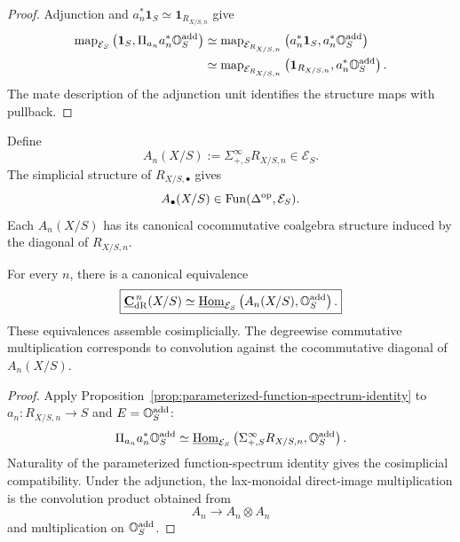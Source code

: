 \begin{proof}
Adjunction and \(a_n^*\mathbf 1_S\simeq\mathbf 1_{R_{X/S,n}}\) give
\[
\begin{aligned}
    \operatorname{map}_{\mathcal E_S}
    \left(
        \mathbf 1_S,\Pi_{a_n}a_n^*\mathbb O_S^{\mathrm{add}}
    \right)
    &\simeq
    \operatorname{map}_{\mathcal E_{R_{X/S,n}}}
    \left(
        a_n^*\mathbf 1_S,a_n^*\mathbb O_S^{\mathrm{add}}
    \right)
    \\
    &\simeq
    \operatorname{map}_{\mathcal E_{R_{X/S,n}}}
    \left(
        \mathbf 1_{R_{X/S,n}},a_n^*\mathbb O_S^{\mathrm{add}}
    \right).
\end{aligned}
\]
The mate description of the adjunction unit identifies the structure maps with pullback.
\end{proof}

\begin{construction}
\label{constr:suspension-modal-nerve}
Define
\[
\boxed{
    A_n(X/S)
    :=
    \Sigma^\infty_{+,S}R_{X/S,n}
    \in\mathcal E_S.
}
\]
The simplicial structure of \(R_{X/S,\bullet}\) gives
\[
    A_\bullet(X/S)\in\operatorname{Fun}(\Delta^{\mathrm{op}},\mathcal E_S).
\]
Each \(A_n(X/S)\) has its canonical cocommutative coalgebra structure induced by the diagonal of
\(R_{X/S,n}\).
\end{construction}

\begin{theorem}
\label{thm:modal-cochains-internal-functions}
For every \(n\), there is a canonical equivalence
\[
\boxed{
    \underline{\mathbf C}_{\mathrm{dR}}^{\,n}(X/S)
    \simeq
    \underline{\operatorname{Hom}}_{\mathcal E_S}
    \left(
        A_n(X/S),
        \mathbb O_S^{\mathrm{add}}
    \right).
}
\]
These equivalences assemble cosimplicially.  The degreewise commutative multiplication corresponds
to convolution against the cocommutative diagonal of \(A_n(X/S)\).
\end{theorem}

\begin{proof}
Apply Proposition~\ref{prop:parameterized-function-spectrum-identity} to
\(a_n:R_{X/S,n}\to S\) and \(E=\mathbb O_S^{\mathrm{add}}\):
\[
    \Pi_{a_n}a_n^*\mathbb O_S^{\mathrm{add}}
    \simeq
    \underline{\operatorname{Hom}}_{\mathcal E_S}
    \left(
        \Sigma^\infty_{+,S}R_{X/S,n},
        \mathbb O_S^{\mathrm{add}}
    \right).
\]
Naturality of the parameterized function-spectrum identity gives the cosimplicial compatibility.
Under the adjunction, the lax-monoidal direct-image multiplication is the convolution product
obtained from
\[
    A_n\longrightarrow A_n\otimes A_n
\]
and multiplication on \(\mathbb O_S^{\mathrm{add}}\).
\end{proof}


